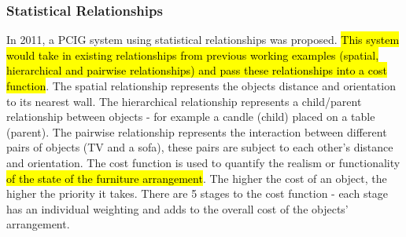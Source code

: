\subsubsection{Statistical Relationships}
In 2011, a PCIG system using statistical relationships was proposed\cite{make-it-home}\cite{youtube:make-it-home}. \hl{This system would take in existing relationships from previous working examples (spatial, hierarchical and pairwise relationships) and pass these relationships into a cost function}. The spatial relationship represents the objects distance and orientation to its nearest wall. The hierarchical relationship represents a child/parent relationship between objects - for example a candle (child) placed on a table (parent). The pairwise relationship represents the interaction between different pairs of objects (TV and a sofa), these pairs are subject to each other's distance and orientation.
The cost function is used to quantify the realism or functionality \hl{ of the state of the furniture arrangement}. The higher the cost of an object, the higher the priority it takes. 
There are 5 stages to the cost function - each stage has an individual weighting and adds to the overall cost of the objects' arrangement.
